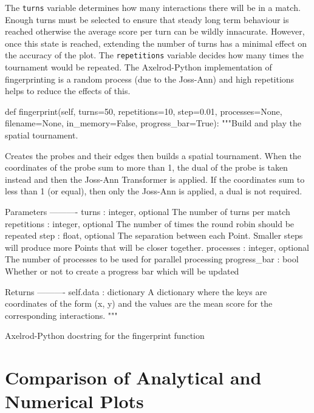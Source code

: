 The \texttt{turns} variable determines how many interactions there will be in a match.
Enough turns must be selected to ensure that steady long term behaviour is reached otherwise the average score per turn can be wildly innacurate.
However, once this state is reached, extending the number of turns has a minimal effect on the accuracy of the plot.
The \texttt{repetitions} variable decides how many times the tournament would be repeated.
The Axelrod-Python implementation of fingerprinting is a random process (due to the Joss-Ann) and high repetitions helps to reduce the effects of this.

\begin{listing}[hbtp!]
\begin{SourceCode}
def fingerprint(self, turns=50, repetitions=10, step=0.01, processes=None,
                filename=None, in_memory=False, progress_bar=True):
    """Build and play the spatial tournament.

    Creates the probes and their edges then builds a spatial tournament.
    When the coordinates of the probe sum to more than 1, the dual of the
    probe is taken instead and then the Joss-Ann Transformer is applied. If
    the coordinates sum to less than 1 (or equal), then only the Joss-Ann is
    applied, a dual is not required.

    Parameters
    ----------
    turns : integer, optional
        The number of turns per match
    repetitions : integer, optional
        The number of times the round robin should be repeated
    step : float, optional
        The separation between each Point. Smaller steps will
        produce more Points that will be closer together.
    processes : integer, optional
        The number of processes to be used for parallel processing
    progress_bar : bool
        Whether or not to create a progress bar which will be updated

    Returns
    ----------
    self.data : dictionary
        A dictionary where the keys are coordinates of the form (x, y) and
        the values are the mean score for the corresponding interactions.
    """
\end{SourceCode}
\caption{Axelrod-Python docstring for the fingerprint function}
\label{lst:fingerprint-docstring}
\end{listing}


\section{Comparison of Analytical and Numerical Plots}

